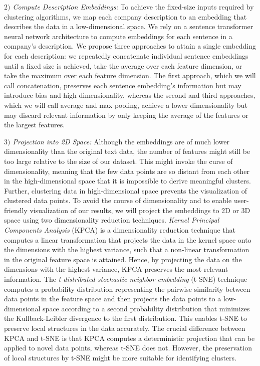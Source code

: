 \documentclass[conference]{IEEEtran}
\begin{document}
\textit{$2)$ Compute Description Embeddings:} To achieve the fixed-size inputs required by clustering algorithms, we map each company description to an embedding that describes the data in a low-dimensional space. We rely on a sentence transformer neural network architecture to compute embeddings for each sentence in a company's description. We propose three approaches to attain a single embedding for each description: we repeatedly concatenate individual sentence embeddings until a fixed size is achieved, take the average over each feature dimension, or take the maximum over each feature dimension. The first approach, which we will call concatenation, preserves each sentence embedding's information but may introduce bias and high dimensionality, whereas the second and third approaches, which we will call average and max pooling, achieve a lower dimensionality but may discard relevant information by only keeping the average of the features or the largest features.

\textit{$3)$ Projection into 2D Space:} Although the embeddings are of much lower dimensionality than the original text data, the number of features might still be too large relative to the size of our dataset. This might invoke the curse of dimensionality, meaning that the few data points are so distant from each other in the high-dimensional space that it is impossible to derive meaningful clusters. Further, clustering data in high-dimensional space prevents the visualization of clustered data points. To avoid the course of dimensionality and to enable user-friendly visualization of our results, we will project the embeddings to 2D or 3D space using two dimensionality reduction techniques.
\emph{Kernel Principal Components Analysis} (KPCA) is a dimensionality reduction technique that computes a linear transformation that projects the data in the kernel space onto the dimensions with the highest variance, such that a non-linear transformation in the original feature space is attained. Hence, by projecting the data on the dimensions with the highest variance, KPCA preserves the most relevant information.
The \emph{t-distributed stochastic neighbor embedding} (t-SNE) technique computes a probability distribution representing the pairwise similarity between data points in the feature space and then projects the data points to a low-dimensional space according to a second probability distribution that minimizes the Kullback-Leibler divergence to the first distribution. This enables t-SNE to preserve local structures in the data accurately.
The crucial difference between KPCA and t-SNE is that KPCA computes a deterministic projection that can be applied to novel data points, whereas t-SNE does not. However, the preservation of local structures by t-SNE might be more suitable for identifying clusters.
\end{document}
